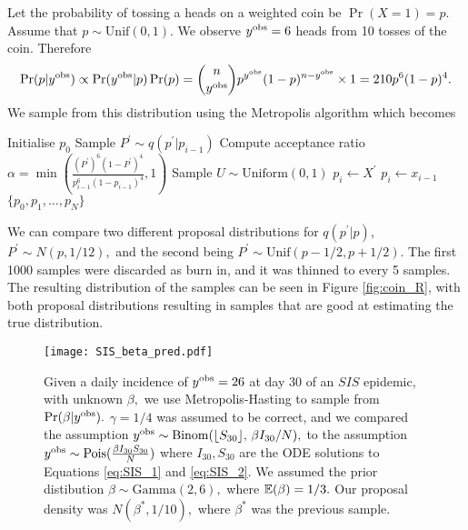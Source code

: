 \begin{example}
    Let the probability of tossing a heads on a weighted coin be
    $\Pr(X = 1) = p.$ Assume that $p\sim \mathrm{Unif}(0,1).$
    We observe $y^{\mathrm{obs}} = 6$ heads from 10 tosses of the coin.
    Therefore
    $$
        \Pr(p | y^{\mathrm{obs}}) \propto \Pr(y^{\mathrm{obs}}| p)\Pr(p)
        = \binom{n}{y^{\mathrm{obs}}}p^{y^{\mathrm{obs}}}(1 - p)^{n - y^{\mathrm{obs}}}\times 1
        = 210p^6(1-p)^4.
    $$
    We sample from this distribution using the Metropolis algorithm which
    becomes
    \begin{algorithmic}[1]
        \State Initialise $p_0$
        \State Sample $P^\prime \sim q(p^\prime|p_{i - 1})$
        \State Compute acceptance ratio
        $\alpha
            = \min\left(
            \frac{(P^\prime)^6(1-P^\prime)^4}{p_{i - 1}^6(1-p_{i - 1})^4}, 1
            \right)$ 
        \State Sample $U \sim \text{Uniform}(0, 1)$
        \State $p_i \gets X^\prime$
        \Else
        \State $p_i \gets x_{i - 1}$
        \EndIf
        \EndFor
        \State \Return $\{p_0, p_1, \dots, p_N\}$
    \end{algorithmic}

    We can compare two
    different proposal distributions for $q(p^\prime | p)$,
    $P^\prime \sim N(p, 1/12),$ and
    the second being $P^\prime \sim \mathrm{Unif}(p - 1/2, p + 1/2).$ The first
    1000 samples were discarded as burn in, and it was thinned to every 5
    samples.
    The resulting distribution of the samples can be seen in Figure
    \ref{fig:coin_R}, with both proposal distributions resulting in samples
    that are good at estimating the true distribution.
\end{example}

\begin{figure}[htbp]
    \centering
    \texttt{[image: SIS\_beta\_pred.pdf]}
    \caption{
        Given a daily incidence of $y^{\mathrm{obs}} = 26$ at day 30 of an $SIS$ epidemic,
        with unknown $\beta,$ we use Metropolis-Hasting to
        sample from $\Pr(\beta | y^{\mathrm{obs}}).$
        $\gamma = 1/4$ was assumed to be correct, and we compared the assumption
        $y^{\mathrm{obs}}
            \sim \mathrm{Binom}(\lfloor S_{30} \rfloor,\, \beta I_{30}/N),$
        to the assumption $y^{\mathrm{obs}} \sim \operatorname{Pois}(\frac{\beta I_{30} S_{30}}{N})$
        where $I_{30}, S_{30}$ are the ODE solutions to Equations
        \ref{eq:SIS_1} and \ref{eq:SIS_2}. We assumed the prior distibution
        $\beta\sim \mathrm{Gamma}(2, 6),$ where $\operatorname{\mathbb{E}}(\beta) = 1/3.$ Our proposal
        density was $N(\beta^\ast, 1/10),$ where $\beta^\ast$ was the previous
        sample.
    }
    \label{fig:SIS_MH_R}
\end{figure}

